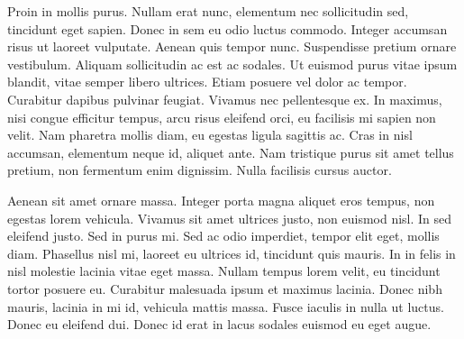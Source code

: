 \documentclass{lowell-prop}
\begin{document}
%
%
% 


\observingRequest 

Proin in mollis purus. Nullam erat nunc, elementum nec sollicitudin sed, tincidunt eget sapien. Donec in sem eu odio luctus commodo. Integer accumsan risus ut laoreet vulputate. Aenean quis tempor nunc. Suspendisse pretium ornare vestibulum. Aliquam sollicitudin ac est ac sodales. Ut euismod purus vitae ipsum blandit, vitae semper libero ultrices. Etiam posuere vel dolor ac tempor. Curabitur dapibus pulvinar feugiat. Vivamus nec pellentesque ex. In maximus, nisi congue efficitur tempus, arcu risus eleifend orci, eu facilisis mi sapien non velit. Nam pharetra mollis diam, eu egestas ligula sagittis ac. Cras in nisl accumsan, elementum neque id, aliquet ante. Nam tristique purus sit amet tellus pretium, non fermentum enim dignissim. Nulla facilisis cursus auctor.

Aenean sit amet ornare massa. Integer porta magna aliquet eros tempus, non egestas lorem vehicula. Vivamus sit amet ultrices justo, non euismod nisl. In sed eleifend justo. Sed in purus mi. Sed ac odio imperdiet, tempor elit eget, mollis diam. Phasellus nisl mi, laoreet eu ultrices id, tincidunt quis mauris. In in felis in nisl molestie lacinia vitae eget massa. Nullam tempus lorem velit, eu tincidunt tortor posuere eu. Curabitur malesuada ipsum et maximus lacinia. Donec nibh mauris, lacinia in mi id, vehicula mattis massa. Fusce iaculis in nulla ut luctus. Donec eu eleifend dui. Donec id erat in lacus sodales euismod eu eget augue.
\end{document}
